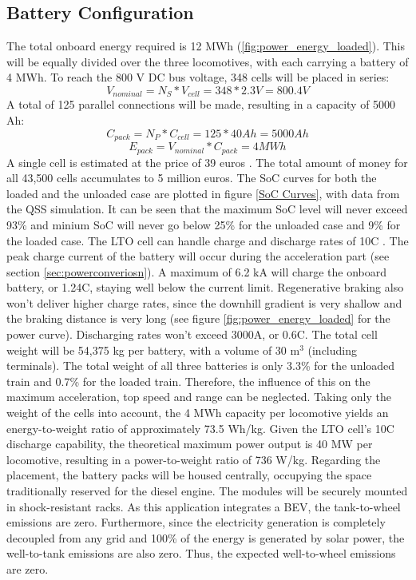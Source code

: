\subsection{Battery Configuration}
The total onboard energy required is 12 MWh (\autoref{fig:power_energy_loaded}). This will be equally divided over the three locomotives, with each carrying a battery of 4 MWh. To reach the 800 V DC bus voltage, 348 cells will be placed in series:
\begin{equation}
    V_{nominal}=N_S*V_{cell}=348*2.3V=800.4V
\end{equation}
A total of 125 parallel connections will be made, resulting in a capacity of 5000 Ah:
\begin{equation}
    C_{pack}=N_P*C_{cell}=125*40Ah=5000Ah
\end{equation}
\begin{equation}
    E_{pack}=V_{nominal}*C_{pack}=4MWh
\end{equation}
A single cell is estimated at the price of 39 euros \cite{price}. The total amount of money for all 43,500 cells accumulates to 5 million euros. The SoC curves for both the loaded and the unloaded case are plotted in figure \ref{SoC Curves}, with data from the QSS simulation. It can be seen that the maximum SoC level will never exceed 93\% and minium SoC will never go below 25\% for the unloaded case and 9\% for the loaded case.
\newline The LTO cell can handle charge and discharge rates of 10C \cite{LTO}. The peak charge current of the battery will occur during the acceleration part (see section \ref{sec:powerconveriosn}). A maximum of 6.2 kA will charge the onboard battery, or 1.24C, staying well below the current limit. Regenerative braking also won't deliver higher charge rates, since the downhill gradient is very shallow and the braking distance is very long (see figure \ref{fig:power_energy_loaded} for the power curve). Discharging rates won't exceed 3000A, or 0.6C.
\newline The total cell weight will be 54,375 kg per battery, with a volume of 30 m$^3$ (including terminals). The total weight of all three batteries is only 3.3\% for the unloaded train and 0.7\% for the loaded train. Therefore, the influence of this on the maximum acceleration, top speed and range can be neglected. Taking only the weight of the cells into account, the 4 MWh capacity per locomotive yields an energy-to-weight ratio of approximately 73.5 Wh/kg. Given the LTO cell's 10C discharge capability, the theoretical maximum power output is 40 MW per locomotive, resulting in a power-to-weight ratio of 736 W/kg. Regarding the placement, the battery packs will be housed centrally, occupying the space traditionally reserved for the diesel engine. The modules will be securely mounted in shock-resistant racks.
\newline As this application integrates a BEV, the tank-to-wheel emissions are zero. Furthermore, since the electricity generation is completely decoupled from any grid and 100\% of the energy is generated by solar power, the well-to-tank emissions are also zero. Thus, the expected well-to-wheel emissions are zero.

